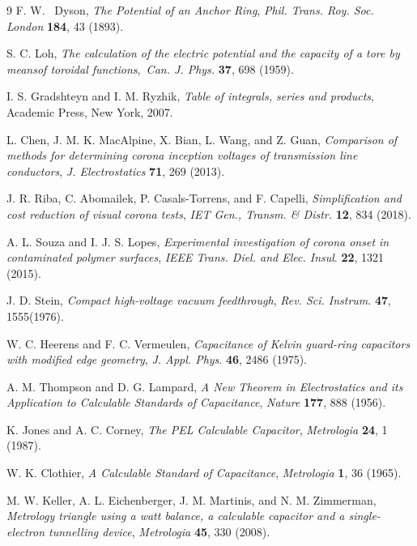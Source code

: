 \documentclass[12pt]{article}
\begin{document}
\begin{thebibliography}{9}
F. W. \ Dyson, \textit{The Potential of an Anchor Ring},
\emph{Phil. Trans. Roy. Soc. London} \textbf{184}, 43 (1893).

S. C. Loh, \textit{The calculation of the electric potential and
the capacity of a tore by meansof toroidal functions},\emph{\ Can. J. Phys.}
\textbf{37}, 698 (1959).

I. S. Gradshteyn and I. M. Ryzhik, \textit{Table of integrals,
series and products}, Academic Press, New York, 2007.

L. Chen, J. M. K. MacAlpine, X. Bian, L. Wang, and Z. Guan,
\textit{Comparison of methods for determining corona inception voltages of
transmission line conductors}, \emph{J. Electrostatics} \textbf{71}, 269 (2013).

J. R. Riba, C. Abomailek, P. Casals-Torrens, and F. Capelli,
\textit{Simplification and cost reduction of visual corona tests}, \emph{IET
Gen., Transm. \& Distr.} \textbf{12}, 834 (2018).

A. L. Souza and I. J. S. Lopes, \textit{Experimental
investigation of corona onset in contaminated polymer surfaces}, \emph{IEEE
Trans. Diel. and Elec. Insul}. \textbf{22}, 1321 (2015).

J. D. Stein, \textit{Compact high-voltage vacuum feedthrough},
\emph{Rev. Sci. Instrum}. \textbf{47}, 1555(1976).

W. C. Heerens and F. C. Vermeulen, \textit{Capacitance of Kelvin
guard-ring capacitors with modified edge geometry}, \emph{J. Appl. Phys}.
\textbf{46}, 2486 (1975).

A. M. Thompson and D. G. Lampard, \textit{A New Theorem in
Electrostatics and its Application to Calculable Standards of Capacitance},
\emph{Nature} \textbf{177}, 888 (1956).

K. Jones and A. C. Corney, \textit{The PEL Calculable
Capacitor}, \emph{Metrologia} \textbf{24}, 1 (1987).

W. K. Clothier, \textit{A Calculable Standard of Capacitance},
\emph{Metrologia} \textbf{1}, 36 (1965).

M. W. Keller, A. L. Eichenberger, J. M. Martinis, and N. M.
Zimmerman, \textit{Metrology triangle using a watt balance, a calculable
capacitor and a single-electron tunnelling device}, \emph{Metrologia}
\textbf{45}, 330 (2008).
\end{thebibliography}
\end{document}
